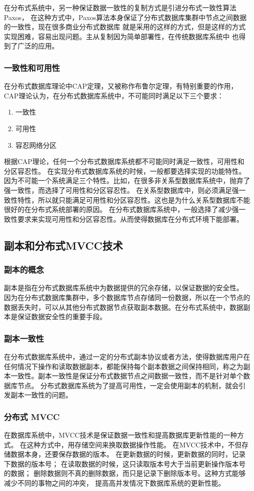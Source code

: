 在分布式系统中，另一种保证数据一致性的复制方式是引进分布式一致性算法Paxos，
在这种方式中，Paxos算法本身保证了分布式数据库集群中节点之间数据的一致性，现在很多商业分布式数据库
就是采用的这样的方式，但是这样的方式实现困难，容易出现问题。主从复制因为简单部署性，在传统数据库系统中
也得到了广泛的应用。
\subsubsection{一致性和可用性}
在分布式数据库理论中CAP定理，又被称作布鲁尔定理，有特别重要的作用，
CAP理论认为，在分布式数据库系统中，不可能同时满足以下三个要求：
\begin{enumerate}
	\item 一致性
	\item 可用性
	\item 容忍网络分区
\end{enumerate}
根据CAP理论，任何一个分布式数据库系统都不可能同时满足一致性，可用性和分区容忍性。
在实现分布式数据库系统的时候，一般都要选择实现的功能特性。
因为不可能一个系统满足三个特性。比如，在很多非关系型数据库系统中，抛弃了强一致性，而选择了可用性和分区容忍性。
在关系型数据库中，则必须满足强一致性特性，所以就只能满足可用性和分区容忍性。这也是为什么关系型数据库不能很好的在分布式系统部署的原因。
在分布式数据库系统中，一般选择了减少强一致性要求来实现可用性和分区容忍性。从而使得数据库在分布式环境下能部署。

\subsection{副本和分布式MVCC技术}
\subsubsection{副本的概念}
副本是指在分布式数据库系统中为数据提供的冗余存储，以保证数据的安全性。
因为在分布式数据库集群中，多个数据库节点存储同一份数据，所以在一个节点的数据丢失时，可以从其他分布式数据节点获取副本数据。在分布式系统中，数据副本是保证数据安全性的重要手段。
\subsubsection{副本一致性}
在分布式数据库系统中，通过一定的分布式副本协议或者方法，使得数据库用户在任何情况下操作和读取数据副本，都能保持每个副本数据之间保持相同，称之为副本一致性。副本一致性是保证分布式数据节点之间数据一致性，而不是针对单个数据库节点。
分布式数据库系统为了提高可用性，一定会使用副本的机制，就会引发副本一致性的问题。
\subsubsection{分布式 MVCC}
在数据库系统中，MVCC技术是保证数据一致性和提高数据库更新性能的一种方式。
在这种方式中，用存储空间来换取数据操作性能。
在MVCC技术中，不但存储数据本身，还要保存数据的版本。
在更新数据的时候，更新数据的同时，记录下数据的版本号；
在读取数据的时候，这只读取版本号大于当前更新操作版本号的数据；
删除数据则不真的删除数据，而只是记录下删除版本号。这种方式能够减少不同的事物之间的冲突，
提高高并发情况下数据库系统的更新性能。

